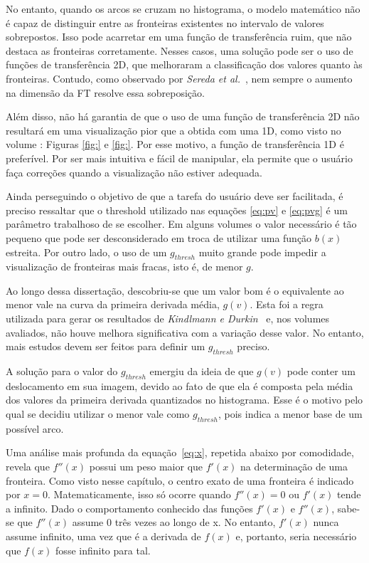 	No entanto, quando os arcos se cruzam no histograma, o modelo matemático não é capaz de distinguir entre as fronteiras existentes no intervalo de valores sobrepostos. Isso pode acarretar em uma função de transferência ruim, que não destaca as fronteiras corretamente. Nesses casos, uma solução pode ser o uso de funções de transferência 2D, que melhoraram a classificação dos valores quanto às fronteiras. Contudo, como observado por \textit{Sereda et al.}~\cite{sereda1}, nem sempre o aumento na dimensão da FT resolve essa sobreposição.
	
	Além disso, não há garantia de que o uso de uma função de transferência 2D não resultará em uma visualização pior que a obtida com uma 1D, como visto no volume : Figuras \ref{fig:} e \ref{fig:}. Por esse motivo, a função de transferência 1D é preferível. Por ser mais intuitiva e fácil de manipular, ela permite que o usuário faça correções quando a visualização não estiver adequada.
	
	Ainda perseguindo o objetivo de que a tarefa do usuário deve ser facilitada, é preciso ressaltar que o threshold utilizado nas equações \eqref{eq:pv} e \eqref{eq:pvg} é um parâmetro trabalhoso de se escolher. Em alguns volumes o valor necessário é tão pequeno que pode ser desconsiderado em troca de utilizar uma função $ b(x) $ estreita. Por outro lado, o uso de um $ g_{thresh} $ muito grande pode impedir a visualização de fronteiras mais fracas, isto é, de menor $ g $.
	
	Ao longo dessa dissertação, descobriu-se que um valor bom é o equivalente ao menor vale na curva da primeira derivada média, $ g(v) $. Esta foi a regra utilizada para gerar os resultados de \textit{Kindlmann e Durkin}~\cite{gordon} e, nos volumes avaliados, não houve melhora significativa com a variação desse valor. No entanto, mais estudos devem ser feitos para definir um $ g_{thresh} $ preciso.
	
	A solução para o valor do $ g_{thresh} $ emergiu da ideia de que $ g(v) $ pode conter um deslocamento em sua imagem, devido ao fato de que ela é composta pela média dos valores da primeira derivada quantizados no histograma. Esse é o motivo pelo qual se decidiu utilizar o menor vale como $ g_{thresh} $, pois indica a menor base de um possível arco.
	
    Uma análise mais profunda da equação~\eqref{eq:x}, repetida abaixo por comodidade, revela que $ f''(x) $ possui um peso maior que $ f'(x) $ na determinação de uma fronteira. Como visto nesse capítulo, o centro exato de uma fronteira é indicado por $ x = 0 $. Matematicamente, isso só ocorre quando $ f''(x) = 0 $ ou $ f'(x) $ tende a infinito. Dado o comportamento conhecido das funções $ f'(x) $ e $ f''(x) $, sabe-se que $ f''(x) $ assume $ 0 $ três vezes ao longo de x. No entanto, $ f'(x) $ nunca assume infinito, uma vez que é a derivada de $ f(x) $ e, portanto, seria necessário que $ f(x) $ fosse infinito para tal.
    
